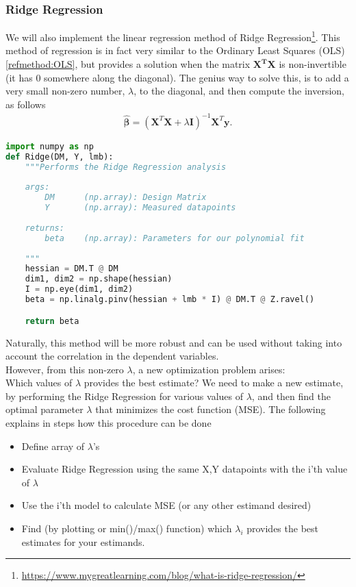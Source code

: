 \documentclass[../main.tex]{subfiles}
\begin{document}
\subsubsection{Ridge Regression}\label{refmethod:RIDGE}
We will also implement the linear regression method of Ridge Regression\footnote{\url{https://www.mygreatlearning.com/blog/what-is-ridge-regression/}}. 
This method of regression is in fact very similar to the Ordinary Least Squares (OLS) \eqref{refmethod:OLS}, but provides a solution when the matrix $\mathbf{X^TX}$ is non-invertible (it has 0 somewhere along the diagonal). The genius way to solve this, is to add a very small non-zero number, $\lambda$, to the diagonal, and then compute the inversion, as follows
\begin{align}
     \mathbf{\hat\beta} = (\mathbf{X}^{T}\mathbf{X} + \lambda\mathbf{I})^{-1}\mathbf{X}^T\mathbf{y}.
\end{align}
\begin{lstlisting}[language=Python]
import numpy as np
def Ridge(DM, Y, lmb):
    """Performs the Ridge Regression analysis
    
    args:
        DM      (np.array): Design Matrix
        Y       (np.array): Measured datapoints
        
    returns:
        beta    (np.array): Parameters for our polynomial fit
    
    """
    hessian = DM.T @ DM
    dim1, dim2 = np.shape(hessian)
    I = np.eye(dim1, dim2)
    beta = np.linalg.pinv(hessian + lmb * I) @ DM.T @ Z.ravel()

    return beta
\end{lstlisting}
\label{code:RIDGE}
\vskip0.1in
Naturally, this method will be more robust and can be used without taking into account the correlation in the dependent variables.  \\\indent However, from this non-zero $\lambda$, a new optimization problem arises:\\Which values of $\lambda$ provides the best estimate? We need to make a new estimate, by performing the Ridge Regression for various values of $\lambda$, and then find the optimal parameter $\lambda$ that minimizes the cost function (MSE). The following explains in steps how this procedure can be done
\begin{itemize}
    \item Define array of $\lambda$'s 
    \item Evaluate Ridge Regression using the same X,Y datapoints with the i'th value of $\lambda$
    \item Use the i'th model to calculate MSE (or any other estimand desired)
    \item Find (by plotting or min()/max() function) which $\lambda_i$ provides the best estimates for your estimands.
\end{itemize}
\end{document}
